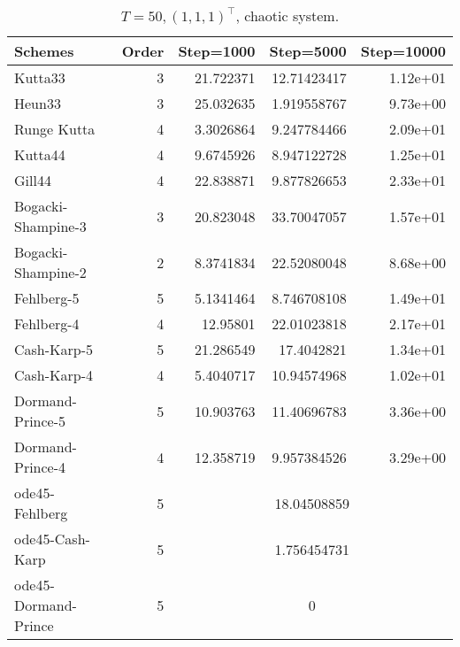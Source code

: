 \documentclass[conference,onecolumn,12pt]{IEEEtran}
\begin{document}
\begin{table}[htbp]
  \centering
  \caption{$T=50,(1,1,1)^\top$, chaotic system.}
    \begin{tabular}{lrccc}
      \toprule
    Schemes & \multicolumn{1}{l}{Order} & \multicolumn{1}{l}{Step=1000} & \multicolumn{1}{l}{Step=5000} & \multicolumn{1}{l}{Step=10000} \\
    \midrule
    Kutta33 & 3     & \multicolumn{1}{r}{21.722371} & \multicolumn{1}{r}{12.71423417} & \multicolumn{1}{r}{1.12e+01} \\
    Heun33 & 3     & \multicolumn{1}{r}{25.032635} & \multicolumn{1}{r}{1.919558767} & \multicolumn{1}{r}{9.73e+00} \\
    Runge Kutta & 4     & \multicolumn{1}{r}{3.3026864} & \multicolumn{1}{r}{9.247784466} & \multicolumn{1}{r}{2.09e+01} \\
    Kutta44 & 4     & \multicolumn{1}{r}{9.6745926} & \multicolumn{1}{r}{8.947122728} & \multicolumn{1}{r}{1.25e+01} \\
    Gill44 & 4     & \multicolumn{1}{r}{22.838871} & \multicolumn{1}{r}{9.877826653} & \multicolumn{1}{r}{2.33e+01} \\
    Bogacki-Shampine-3 & 3     & \multicolumn{1}{r}{20.823048} & \multicolumn{1}{r}{33.70047057} & \multicolumn{1}{r}{1.57e+01} \\
    Bogacki-Shampine-2 & 2     & \multicolumn{1}{r}{8.3741834} & \multicolumn{1}{r}{22.52080048} & \multicolumn{1}{r}{8.68e+00} \\
    Fehlberg-5 & 5     & \multicolumn{1}{r}{5.1341464} & \multicolumn{1}{r}{8.746708108} & \multicolumn{1}{r}{1.49e+01} \\
    Fehlberg-4 & 4     & \multicolumn{1}{r}{12.95801} & \multicolumn{1}{r}{22.01023818} & \multicolumn{1}{r}{2.17e+01} \\
    Cash-Karp-5 & 5     & \multicolumn{1}{r}{21.286549} & \multicolumn{1}{r}{17.4042821} & \multicolumn{1}{r}{1.34e+01} \\
    Cash-Karp-4 & 4     & \multicolumn{1}{r}{5.4040717} & \multicolumn{1}{r}{10.94574968} & \multicolumn{1}{r}{1.02e+01} \\
    Dormand-Prince-5 & 5     & \multicolumn{1}{r}{10.903763} & \multicolumn{1}{r}{11.40696783} & \multicolumn{1}{r}{3.36e+00} \\
    Dormand-Prince-4 & 4     & \multicolumn{1}{r}{12.358719} & \multicolumn{1}{r}{9.957384526} & \multicolumn{1}{r}{3.29e+00} \\
    ode45-Fehlberg & 5     & \multicolumn{3}{c}{18.04508859} \\
    ode45-Cash-Karp & 5     & \multicolumn{3}{c}{1.756454731} \\
    ode45-Dormand-Prince & 5     & \multicolumn{3}{c}{0} \\
    \bottomrule
    \end{tabular}%
  \label{tab:3}%
\end{table}%
\end{document}
